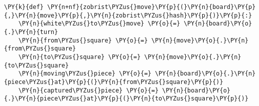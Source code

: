     \begin{tcolorbox}[fontupper=\linespread{.66}\selectfont, breakable, size=fbox, boxrule=1pt, pad at break*=1mm,colback=cellbackground, colframe=cellborder]
\begin{Verbatim}[commandchars=\\\{\}]
\PY{k}{def} \PY{n+nf}{zobrist\PYZus{}move}\PY{p}{(}\PY{n}{board}\PY{p}{,}\PY{n}{move}\PY{p}{,}\PY{n}{zobrist\PYZus{}hash}\PY{p}{)}\PY{p}{:}
    \PY{n}{white\PYZus{}to\PYZus{}move} \PY{o}{=} \PY{n}{board}\PY{o}{.}\PY{n}{turn}
    \PY{n}{from\PYZus{}square} \PY{o}{=} \PY{n}{move}\PY{o}{.}\PY{n}{from\PYZus{}square}
    \PY{n}{to\PYZus{}square} \PY{o}{=} \PY{n}{move}\PY{o}{.}\PY{n}{to\PYZus{}square}
    \PY{n}{moving\PYZus{}piece} \PY{o}{=} \PY{n}{board}\PY{o}{.}\PY{n}{piece\PYZus{}at}\PY{p}{(}\PY{n}{from\PYZus{}square}\PY{p}{)}
    \PY{n}{captured\PYZus{}piece} \PY{o}{=} \PY{n}{board}\PY{o}{.}\PY{n}{piece\PYZus{}at}\PY{p}{(}\PY{n}{to\PYZus{}square}\PY{p}{)}


\end{Verbatim}
\end{tcolorbox}
